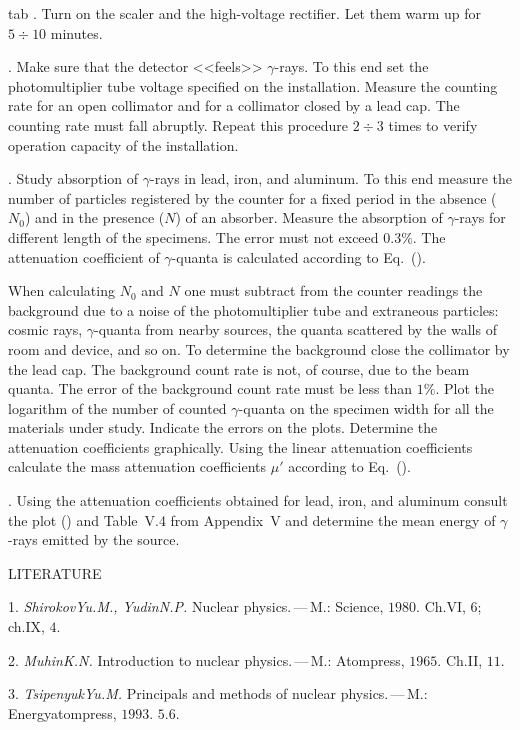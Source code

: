 \textbf{}\vspace{5pt}

\begin{Enumerate}{tab}
\Item.
Turn on the scaler and the high-voltage rectifier. Let them warm up for $5\div10$ minutes.

\Item.
Make sure that the detector <<feels>> $\gamma$-rays. To this end set the photomultiplier tube voltage specified on the installation. Measure the counting rate for an open collimator and for a collimator closed by a lead cap. The counting rate must fall abruptly. Repeat this procedure $2\div3$ times to verify operation capacity of the installation.

\Item. Study absorption of $\gamma$-rays in lead, iron, and aluminum. To this end measure the number of particles registered by the counter for a fixed period in the absence ($N_0$) and in the presence ($N$) of an absorber. Measure the absorption of $\gamma$-rays for different length of the specimens. The error must not exceed $0{.}3\%$. The attenuation coefficient of $\gamma$-quanta is calculated according to Eq.~().

When calculating $N_0$ and $N$ one must subtract from the counter readings the background due to a noise of the photomultiplier tube and extraneous particles: cosmic rays, \mbox{$\gamma$-quanta} from nearby sources, the quanta scattered by the walls of room and device, and so on. To determine the background close the collimator by the lead cap. The background count rate is not, of course, due to the beam quanta. The error of the background count rate must be less than $1\%$. Plot the logarithm of the number of counted $\gamma$-quanta on the specimen width for all the materials under study. Indicate the errors on the plots. Determine the attenuation coefficients  graphically. Using the linear attenuation coefficients calculate the mass attenuation coefficients $\mu'$ according to Eq.~().

\Item. Using the attenuation coefficients obtained for lead, iron, and aluminum consult the plot () and Table~V.4 from Appendix~V and determine the mean energy of $\gamma$-rays emitted by the source. 
\end{Enumerate}

\begin{center}{\textsf{\small LITERATURE}}\end{center}

{\small 1. \textit{Shirokov\;Yu.\;M., Yudin\;N.\;P.} Nuclear physics.\,---\,M.: Science, $1980$. Ch.\;VI, \textsection\; $6$; ch.\;IX,\textsection\; $4$.

2. \textit{Muhin\;K.\;N.} Introduction to nuclear physics.\,---\,M.: Atompress, $1965$. Ch.\;II, \textsection\;$11$.

3. \textit{Tsipenyuk\;Yu.\;M.} Principals and methods of nuclear physics.\,---\,M.: Energyatompress, $1993$. \textsection\;$5{.}6$. }